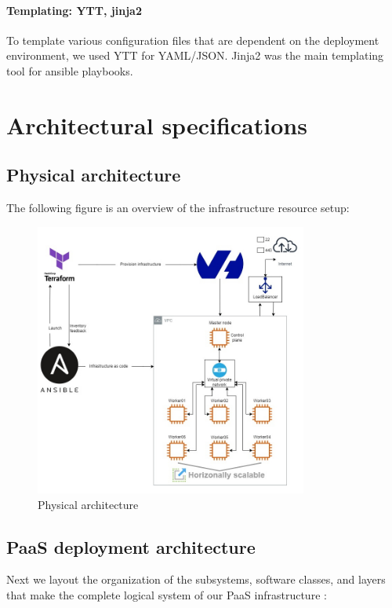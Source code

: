 \paragraph{Templating: YTT, jinja2 }

To template various configuration files that are dependent on the deployment environment, we used YTT for YAML/JSON. Jinja2 was the main templating tool for ansible playbooks. 

\newpage

\section{Architectural specifications}

\subsection{Physical architecture}

The following figure is an overview of the infrastructure resource setup:

\begin{figure}[!ht]\centering
\includegraphics[width=0.8\textwidth,angle=00]{assets/f7.jpg}
\caption{Physical architecture}
\label{fig:f7}
\end{figure}

\newpage

\subsection{PaaS deployment architecture} 
Next we layout the organization of the subsystems, software classes, and layers that make the complete logical system of our PaaS infrastructure :

